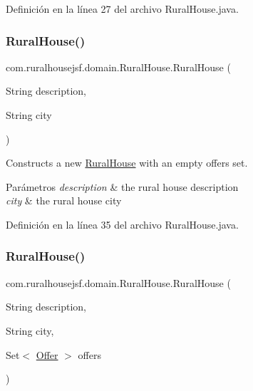 Definición en la línea 27 del archivo Rural\+House.\+java.

\mbox{\label{classcom_1_1ruralhousejsf_1_1domain_1_1_rural_house_aa3488a4d0e876307f91f80784a5538a5}} 
\subsubsection{\texorpdfstring{RuralHouse()}{RuralHouse()}\hspace{0.1cm}{\footnotesize\ttfamily [2/3]}}
{\footnotesize\ttfamily com.\+ruralhousejsf.\+domain.\+Rural\+House.\+Rural\+House (\begin{DoxyParamCaption}\item[{String}]{description,  }\item[{String}]{city }\end{DoxyParamCaption})}



Constructs a new \mbox{\hyperlink{classcom_1_1ruralhousejsf_1_1domain_1_1_rural_house}{Rural\+House}} with an empty offers set. 


\begin{DoxyParams}{Parámetros}
{\em description} & the rural house description \\
\hline
{\em city} & the rural house city \\
\hline
\end{DoxyParams}


Definición en la línea 35 del archivo Rural\+House.\+java.

\mbox{\label{classcom_1_1ruralhousejsf_1_1domain_1_1_rural_house_a7a4e2da81d0c806e058f446b4c657458}} 
\subsubsection{\texorpdfstring{RuralHouse()}{RuralHouse()}\hspace{0.1cm}{\footnotesize\ttfamily [3/3]}}
{\footnotesize\ttfamily com.\+ruralhousejsf.\+domain.\+Rural\+House.\+Rural\+House (\begin{DoxyParamCaption}\item[{String}]{description,  }\item[{String}]{city,  }\item[{Set$<$ \mbox{\hyperlink{classcom_1_1ruralhousejsf_1_1domain_1_1_offer}{Offer}} $>$}]{offers }\end{DoxyParamCaption})}



